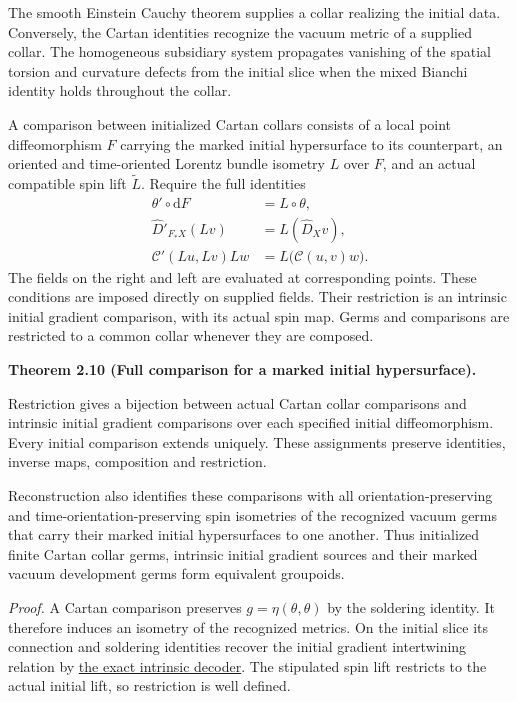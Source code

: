 \documentclass[
  english,
  11pt,
  reqno]{amsart}
\makeatletter
\newcommand{\pandocstatementheading}[1]{%
  \par\if@nobreak\else
    \addpenalty{\@beginparpenalty}%
    \addvspace{.5\baselineskip plus .2\baselineskip minus .2\baselineskip}%
  \fi
  {\normalfont\bfseries #1\par}%
  \nobreak\@afterindenttrue\@afterheading
}
\makeatother
\begin{document}
The smooth Einstein Cauchy theorem supplies a collar realizing the
initial data. Conversely, the Cartan identities recognize the vacuum
metric of a supplied collar. The homogeneous subsidiary system
propagates vanishing of the spatial torsion and curvature defects from
the initial slice when the mixed Bianchi identity holds throughout the
collar.

A comparison between initialized Cartan collars consists of a local
point diffeomorphism \(F\) carrying the marked initial hypersurface to
its counterpart, an oriented and time-oriented Lorentz bundle isometry
\(L\) over \(F\), and an actual compatible spin lift \(\widetilde L\).
Require the full identities%
 \[
\begin{aligned}
\theta'\circ\mathrm dF&=L\circ\theta,\\
\widehat D'_{F_*X}(Lv)&=L(\widehat D_Xv),\\
\mathcal C'(Lu,Lv)Lw&=L\bigl(\mathcal C(u,v)w\bigr).
\end{aligned}
\] The fields on the right and left are evaluated at corresponding
points. These conditions are imposed directly on supplied fields. Their
restriction is an intrinsic initial gradient comparison, with its actual
spin map. Germs and comparisons are restricted to a common collar
whenever they are composed.

\pandocstatementheading{\leavevmode{}\label{thm:online-marked-collar-full-hom}Theorem 2.10 (Full comparison for a marked initial hypersurface).}

Restriction gives a bijection between actual Cartan collar comparisons
and intrinsic initial gradient comparisons over each specified initial
diffeomorphism. Every initial comparison extends uniquely. These
assignments preserve identities, inverse maps, composition and
restriction.

Reconstruction also identifies these comparisons with all
orientation-preserving and time-orientation-preserving spin isometries
of the recognized vacuum germs that carry their marked initial
hypersurfaces to one another. Thus initialized finite Cartan collar
germs, intrinsic initial gradient sources and their marked vacuum
development germs form equivalent groupoids.

\emph{Proof.} A Cartan comparison preserves \(g=\eta(\theta,\theta)\) by
the soldering identity. It therefore induces an isometry of the
recognized metrics. On the initial slice its connection and soldering
identities recover the initial gradient intertwining relation by
\hyperref[lem:online-intrinsic-gradient-decoder]{the exact intrinsic
decoder}. The stipulated spin lift restricts to the actual initial lift,
so restriction is well defined.
\end{document}

